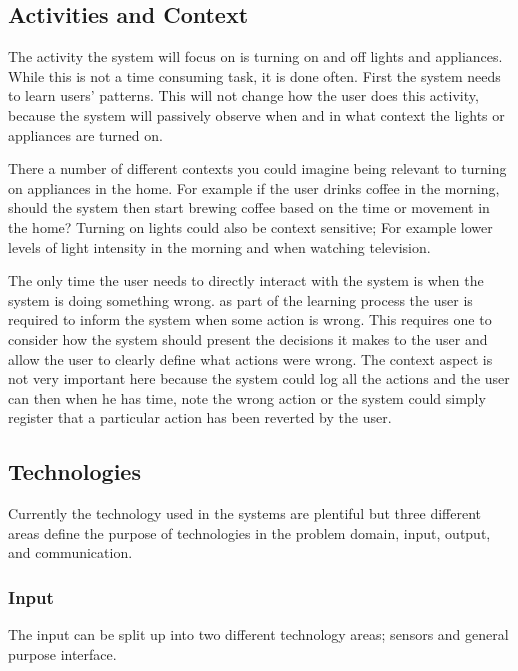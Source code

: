 \subsection{Activities and Context}
The activity the system will focus on is turning on and off lights and
appliances. While this is not a time consuming task, it is done often. First the
system needs to learn users' patterns. This will not change how the user does
this activity, because the system will passively observe when and in what
context the lights or appliances are turned on.

There a number of different
contexts you could imagine being relevant to turning on appliances in the home.
For example if the user drinks coffee in the morning, should the system then
start brewing coffee based on the time or movement in the home? Turning on
lights could also be context sensitive; For example lower levels of light
intensity in the morning and when watching television.

The only time the user needs to directly interact with the system is when the system is doing something wrong. as part of the learning process the user is required to inform the system when some action is wrong. This requires one to consider how the system should present the decisions it makes to the user and allow the user to clearly define what actions were wrong. The context aspect is not very important here because the system could log all the actions and the user can then when he has time, note the wrong action or the system could simply register that a particular action has been reverted by the user.

\subsection{Technologies}
\label{sub:Technologies}
Currently the technology used in the systems are plentiful but three different areas define the purpose of technologies in the problem domain, input, output, and communication.
\subsubsection{Input}
The input can be split up into two different technology areas; sensors and general purpose interface.

